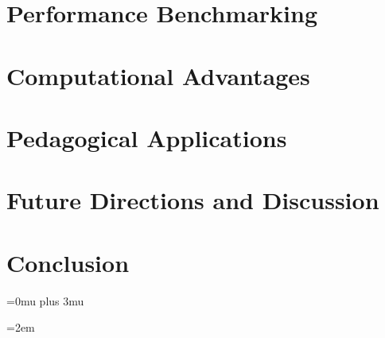 \documentclass[10pt,twocolumn]{article}
\begin{document}
\section{Performance Benchmarking}


\section{Computational Advantages}


\section{Pedagogical Applications}


\section{Future Directions and Discussion}


\section{Conclusion}


\appendix



% 
% 
% 
% 

\nocite{*}

\makeatletter
\def\url@leostyle{\@ifundefined{selectfont}{\def\UrlFont{\sf}}{\def\UrlFont{\small\ttfamily}}}
\makeatother
{}

\Urlmuskip=0mu plus 3mu

\sloppy
\emergencystretch=2em



\end{document}
